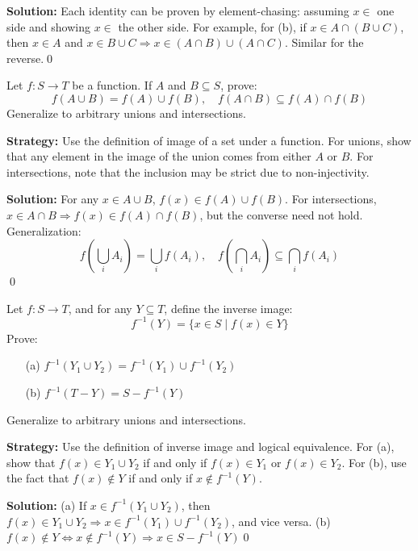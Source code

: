 \bigskip\noindent\textbf{Solution:}  
Each identity can be proven by element-chasing: assuming \( x \in \) one side and showing \( x \in \) the other side.  
For example, for (b), if \( x \in A \cap (B \cup C) \), then \( x \in A \) and \( x \in B \cup C \Rightarrow x \in (A \cap B) \cup (A \cap C) \). Similar for the reverse.\qed



\begin{problembox}
Let \( f: S \to T \) be a function. If \( A \) and \( B \subseteq S \), prove:
\[
f(A \cup B) = f(A) \cup f(B), \quad f(A \cap B) \subseteq f(A) \cap f(B)
\]
Generalize to arbitrary unions and intersections.
\end{problembox}

\noindent\textbf{Strategy:} Use the definition of image of a set under a function. For unions, show that any element in the image of the union comes from either $A$ or $B$. For intersections, note that the inclusion may be strict due to non-injectivity.

\noindent\bigskip\noindent\textbf{Solution:}  
For any \( x \in A \cup B \), \( f(x) \in f(A) \cup f(B) \).  
For intersections, \( x \in A \cap B \Rightarrow f(x) \in f(A) \cap f(B) \), but the converse need not hold.  
Generalization:  
\[
f\left( \bigcup_i A_i \right) = \bigcup_i f(A_i), \quad f\left( \bigcap_i A_i \right) \subseteq \bigcap_i f(A_i)
\]\qed



\begin{problembox}
Let \( f: S \to T \), and for any \( Y \subseteq T \), define the inverse image:
\[
f^{-1}(Y) = \{x \in S \mid f(x) \in Y \}
\]
Prove:
\begin{itemize}
\item[(a)] \( f^{-1}(Y_1 \cup Y_2) = f^{-1}(Y_1) \cup f^{-1}(Y_2) \)
\item[(b)] \( f^{-1}(T - Y) = S - f^{-1}(Y) \)
\end{itemize}
Generalize to arbitrary unions and intersections.
\end{problembox}

\noindent\textbf{Strategy:} Use the definition of inverse image and logical equivalence. For (a), show that $f(x) \in Y_1 \cup Y_2$ if and only if $f(x) \in Y_1$ or $f(x) \in Y_2$. For (b), use the fact that $f(x) \notin Y$ if and only if $x \notin f^{-1}(Y)$.

\noindent\bigskip\noindent\textbf{Solution:}  
(a) If \( x \in f^{-1}(Y_1 \cup Y_2) \), then \( f(x) \in Y_1 \cup Y_2 \Rightarrow x \in f^{-1}(Y_1) \cup f^{-1}(Y_2) \), and vice versa.  
(b) \( f(x) \notin Y \iff x \notin f^{-1}(Y) \Rightarrow x \in S - f^{-1}(Y) \)\qed



